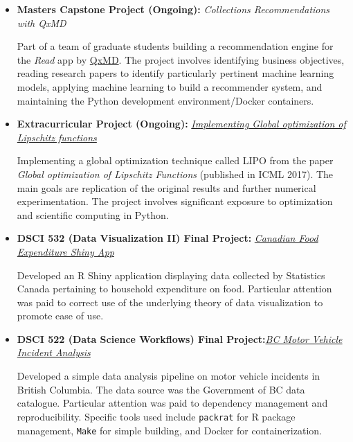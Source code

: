 \documentclass[11pt,a4paper,sans]{moderncv}        %
\newcommand\Colorhref[3][cyan]{\href{#2}{\small\color{#1}#3}}
\begin{document}
\begin{itemize}

\item{\textbf{Masters Capstone Project (Ongoing):} \textit{Collections Recommendations with QxMD}

\vspace{3pt}

\small{Part of a team of graduate students building a recommendation engine 
for the \textit{Read} app by \Colorhref{https://qxmd.com/}{QxMD}. The project involves identifying business objectives, reading research papers to identify particularly pertinent machine learning models, applying machine learning to build a recommender system, and maintaining the Python development environment/Docker containers.}}

\vspace{6pt}

\item{\textbf{Extracurricular Project (Ongoing):} \textit{\Colorhref{https://github.com/UBC-CS/lipo-python}{Implementing Global optimization of Lipschitz functions}}

\vspace{3pt}

\small{Implementing a global optimization technique 
called LIPO from the paper \textit{Global optimization of Lipschitz Functions} (published in ICML 2017). The main goals are replication of the original results and further 
numerical experimentation. The project involves significant exposure to optimization and scientific computing in Python.}}

\vspace{6pt}

\item{\textbf{DSCI 532 (Data Visualization II) Final Project:} \textit{\Colorhref{https://github.com/bradleypick/food-expenditure}{Canadian Food Expenditure Shiny App}}

\vspace{3pt}

\small{Developed an R Shiny application displaying data 
collected by Statistics Canada pertaining to household expenditure on food. Particular 
attention was paid to correct use of the underlying theory of data visualization to promote ease of use.}}

\vspace{6pt}

\item{\textbf{DSCI 522 (Data Science Workflows) Final Project:}\textit{\Colorhref{https://github.com/bradleypick/BC-motor-vehicle-incidents}{BC Motor Vehicle Incident Analysis}}

\vspace{3pt}

\small{Developed a simple data analysis pipeline on motor 
vehicle incidents in British Columbia. The data source was the Government of BC data catalogue.
Particular attention was paid to dependency management and reproducibility. 
Specific tools used include \texttt{packrat} for R package management, \texttt{Make} for simple building, and 
Docker for containerization.}}

\end{itemize}
\end{document}
